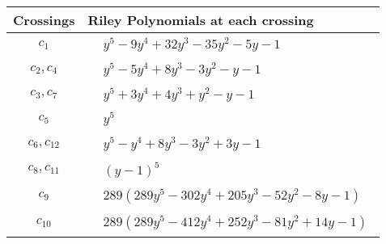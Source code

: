 \documentclass[1p]{elsarticle_modified}
\theoremstyle{definition}
\begin{document}
\begin{tabular}{m{50pt}|m{274pt}}
Crossings & \hspace{64pt}Riley Polynomials at each crossing \\
\hline $$\begin{aligned}c_{1}\end{aligned}$$&$\begin{aligned}
&y^5-9 y^4+32 y^3-35 y^2-5 y-1
\end{aligned}$\\
\hline $$\begin{aligned}c_{2},c_{4}\end{aligned}$$&$\begin{aligned}
&y^5-5 y^4+8 y^3-3 y^2- y-1
\end{aligned}$\\
\hline $$\begin{aligned}c_{3},c_{7}\end{aligned}$$&$\begin{aligned}
&y^5+3 y^4+4 y^3+y^2- y-1
\end{aligned}$\\
\hline $$\begin{aligned}c_{5}\end{aligned}$$&$\begin{aligned}
&y^5
\end{aligned}$\\
\hline $$\begin{aligned}c_{6},c_{12}\end{aligned}$$&$\begin{aligned}
&y^5- y^4+8 y^3-3 y^2+3 y-1
\end{aligned}$\\
\hline $$\begin{aligned}c_{8},c_{11}\end{aligned}$$&$\begin{aligned}
&(y-1)^5
\end{aligned}$\\
\hline $$\begin{aligned}c_{9}\end{aligned}$$&$\begin{aligned}
&289(289 y^5-302 y^4+205 y^3-52 y^2-8 y-1)
\end{aligned}$\\
\hline $$\begin{aligned}c_{10}\end{aligned}$$&$\begin{aligned}
&289(289 y^5-412 y^4+252 y^3-81 y^2+14 y-1)
\end{aligned}$\\
\hline
\end{tabular}\\~\\
\end{document}
